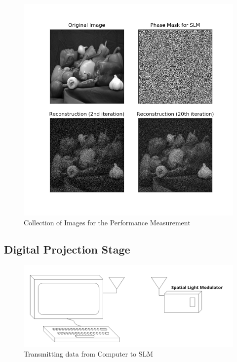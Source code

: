 \documentclass[12pt]{article}
\begin{document}
\begin{figure}
    \centering
    \includegraphics[width=\textwidth]{Result.png}
    \caption{Collection of Images for the Performance Measurement}
    \label{fig:images_recon}
\end{figure}

\subsection{Digital Projection Stage}

\begin{figure}
    \centering
    \includegraphics[width=\textwidth]{transmission}
    \caption{Transmitting data from Computer to SLM}
    \label{fig:transmit}
\end{figure}
\end{document}
